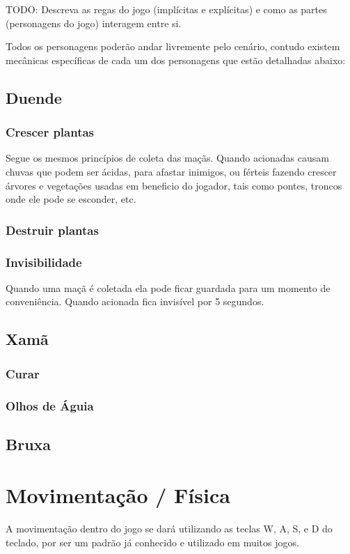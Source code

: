 TODO: Descreva as regas do jogo (implícitas e explícitas) e como as partes (personagens do jogo) interagem entre si.

Todos os personagens poderão andar livremente pelo cenário, contudo existem mecânicas específicas de cada um dos personagens que estão detalhadas abaixo:


\subsection{Duende}
\subsubsection{Crescer plantas}
Segue os mesmos princípios de coleta das maçãs. Quando acionadas causam chuvas que podem ser ácidas, para afastar inimigos, ou férteis fazendo crescer árvores e vegetações usadas em beneficio do jogador, tais como pontes, troncos onde ele pode se esconder, etc.
\subsubsection{Destruir plantas}
\subsubsection{Invisibilidade}
Quando uma maçã é coletada ela pode ficar guardada para um momento de conveniência. Quando acionada fica invisível por 5 segundos.

\subsection{Xamã}

\subsubsection{Curar}
\subsubsection{Olhos de Águia}

\subsection{Bruxa}


\section{Movimentação / Física}
A movimentação dentro do jogo se dará utilizando as teclas W, A, S, e D do teclado, por ser um padrão já conhecido e utilizado em muitos jogos.

